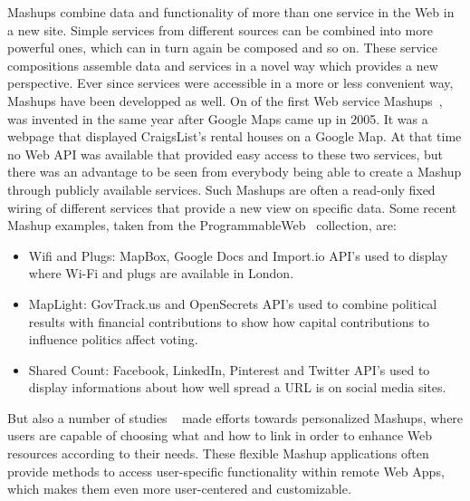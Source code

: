 \textrm{Mashups} combine data and functionality of more than one service in the Web in a new site.
Simple services from different sources can be combined into more powerful ones, which can in turn again be composed and so on.
These service compositions assemble data and services in a novel way which provides a new perspective.
Ever since services were accessible in a more or less convenient way, \textrm{Mashups} have been developped as well.
On of the first Web service \textrm{Mashups}~\cite{wwwHosuingMaps}, was invented in the same year after Google Maps came up in 2005.
It was a webpage that displayed CraigsList's rental houses on a Google Map.
At that time no \textrm{Web API} was available that provided easy access to these two services, but there was an advantage to be seen from everybody being able to create a \textrm{Mashup} through publicly available services.
Such \textrm{Mashups} are often a read-only fixed wiring of different services that provide a new view on specific data.
Some recent \textrm{Mashup} examples, taken from the \textrm{ProgrammableWeb}~\cite{wwwProgrammableWeb} collection, are:

\begin{itemize}
  \item \textrm{Wifi and Plugs}: MapBox, Google Docs and Import.io API's used to display where Wi-Fi and plugs are available in London.
  \item \textrm{MapLight}: GovTrack.us and OpenSecrets API's used to combine political results with financial contributions to show how capital contributions to influence politics affect voting.
  \item \textrm{Shared Count}: Facebook, LinkedIn, Pinterest and Twitter API's used to display informations about how well spread a URL is on social media sites.
\end{itemize}

But also a number of studies ~\cite{10.1007/978-3-642-22233-7_11}\cite{4278815}\cite{Rizzotti:2010:UST:1772690.1772861}\cite{Stolee20131289} made efforts towards personalized \textrm{Mashups}, where users are capable of choosing what and how to link in order to enhance Web resources according to their needs.
These flexible \textrm{Mashup} applications often provide methods to access user-specific functionality within remote \textrm{Web Apps}, which makes them even more user-centered and customizable.


